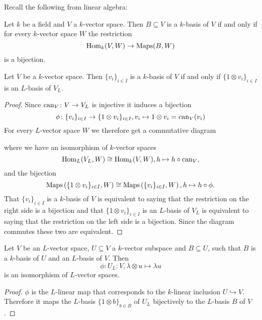 Recall the following from linear algebra:


\begin{rec}
 Let $k$ be a field and $V$ a $k$-vector space. Then $B \subseteq V$ is a $k$-basis of $V$ if and only if for every $k$-vector space $W$ the restriction
 \[
  \operatorname{Hom}_k(V,W) \to \operatorname{Maps}(B,W)
 \]
 is a bijection.
\end{rec}


\begin{lem}
 Let $V$ be a $k$-vector space. Then $\{v_i\}_{i \in I}$ is a $k$-basis of $V$ if and only if $\{1 \otimes v_i\}_{i \in I}$ is an $L$-basis of $V_L$.
\end{lem}
\begin{proof}
 Since $\operatorname{can}_V \colon V \to V_L$ is injective it induces a bijection
 \[
  \phi \colon \{v_i\}_{i \in I} \to \{1 \otimes v_i\}_{i \in I}, v_i \mapsto 1 \otimes v_i = \operatorname{can}_V(v_i)
 \]
 For every $L$-vector space $W$ we therefore get a commutative diagram
 \begin{center}
 \end{center}
 where we have an isomorphism of $k$-vector spaces
 \[
  \operatorname{Hom}_L(V_L, W) \cong \operatorname{Hom}_k(V, W), h \mapsto h \circ \operatorname{can}_V,
 \]
 and the bijection
 \[
  \operatorname{Maps}\left( \{1 \otimes v_i\}_{i \in I}, W\right ) \cong \operatorname{Maps}\left( \{v_i\}_{i \in I} ,W\right ), h \mapsto h \circ \phi.
 \]
 That $\{v_i\}_{i \in I}$ is a $k$-basis of $V$ is equivalent to saying that the restriction on the right side is a bijection and that $\{1 \otimes v_i\}_{i \in I}$ is an $L$-basis of $V_L$ is equivalent to saying that the restriction on the left side is a bijection. Since the diagram commutes these two are equivalent.
\end{proof}


\begin{cor}\label{cor: inclusion to bijection vector spaces}
 Let $V$ be an $L$-vector space, $U \subseteq V$ a $k$-vector subspace and $B \subseteq U$, such that $B$ is a $k$-basis of $U$ and an $L$-basis of $V$. Then
 \[
  \phi \colon U_L \colon V, \lambda \otimes u \mapsto \lambda u
 \]
 is an isomorphism of $L$-vector spaces.
\end{cor}
\begin{proof}
 $\phi$ is the $L$-linear map that corresponds to the $k$-linear inclusion $U \hookrightarrow V$. Therefore it maps the $L$-basis $\{1 \otimes b\}_{b \in B}$ of $U_L$ bijectively to the $L$-basis $B$ of $V$.
\end{proof}





